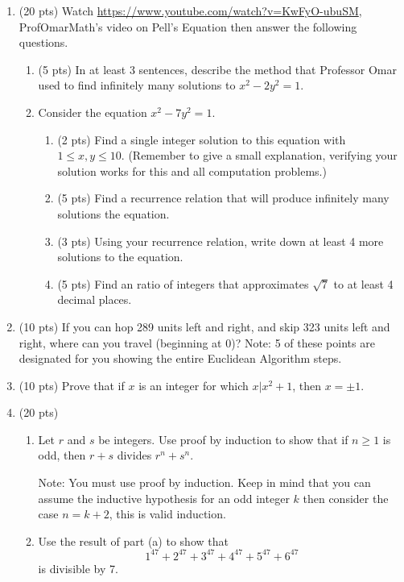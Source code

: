 \documentclass[12pt]{article}
\begin{document}
\begin{enumerate}
	\item (20 pts) Watch \url{https://www.youtube.com/watch?v=KwFyO-ubuSM}, ProfOmarMath's video on Pell's Equation then answer the following questions.
		\begin{enumerate}
			\item (5 pts) In at least 3 sentences, describe the method that Professor Omar used to find infinitely many solutions to $x^2-2y^2=1$.
				\vfill
			\item Consider the equation $x^2-7y^2=1$.  
				\begin{enumerate}
					\item (2 pts) Find a single integer solution to this equation with $1\leq x,y\leq 10$. (Remember to give a small explanation, verifying your solution works for this and all computation problems.)
						\vskip 1in
					\item (5 pts) Find a recurrence relation that will produce infinitely many solutions the equation.
						\vfill
						\newpage
					\item (3 pts) Using your recurrence relation, write down at least 4 more solutions to the equation.
						\vfill
					\item (5 pts) Find an ratio of integers that approximates $\sqrt{7}$ to at least 4 decimal places. 
					\vfill
				\end{enumerate}
		\end{enumerate}
	\newpage
	\item (10 pts) If you can hop 289 units left and right, and skip 323 units left and right, where can you travel (beginning at 0)?  Note: 5 of these points are designated for you showing the entire Euclidean Algorithm steps.
		\vfill
		\newpage
	\item (10 pts) Prove that if $x$ is an integer for which $x|x^2+1$, then $x=\pm 1$.
		\vfill
		\newpage
	\item (20 pts) 
		\begin{enumerate}
			\item Let $r$ and $s$ be integers. Use proof by induction to show that if $n\geq 1$ is odd, then $r+s$ divides $r^n+s^n$.
			
			Note: You must use proof by induction.  Keep in mind that you can assume the inductive hypothesis for an odd integer $k$ then consider the case $n=k+2$, this is valid induction.
				\vfill
				\newpage
			\item Use the result of part (a) to show that 
				\[1^{47}+2^{47}+3^{47}+4^{47}+5^{47}+6^{47}\]
				is divisible by 7.
				

\end{enumerate}
\end{enumerate}
\end{document}
